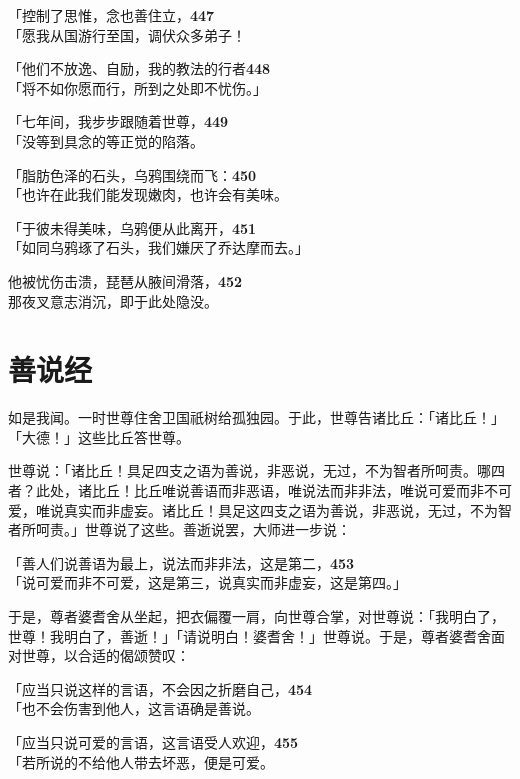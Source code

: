 「控制了思惟，念也善住立，\hfill{\grayfootnotesize \textbf{447}} \\
「愿我从国游行至国，调伏众多弟子！


「他们不放逸、自励，我的教法的行者\hfill{\grayfootnotesize \textbf{448}} \\
「将不如你愿而行，所到之处即不忧伤。」


「七年间，我步步跟随着世尊，\hfill{\grayfootnotesize \textbf{449}} \\
「没等到具念的等正觉的陷落。


「脂肪色泽的石头，乌鸦围绕而飞：\hfill{\grayfootnotesize \textbf{450}} \\
「也许在此我们能发现嫩肉，也许会有美味。


「于彼未得美味，乌鸦便从此离开，\hfill{\grayfootnotesize \textbf{451}} \\
「如同乌鸦琢了石头，我们嫌厌了乔达摩而去。」


他被忧伤击溃，琵琶从腋间滑落，\hfill{\grayfootnotesize \textbf{452}} \\
那夜叉意志消沉，即于此处隐没。


\section{善说经}

如是我闻。一时世尊住舍卫国祇树给孤独园。于此，世尊告诸比丘：「诸比丘！」「大德！」这些比丘答世尊。


世尊说：「诸比丘！具足四支之语为善说，非恶说，无过，不为智者所呵责。哪四者？此处，诸比丘！比丘唯说善语而非恶语，唯说法而非非法，唯说可爱而非不可爱，唯说真实而非虚妄。诸比丘！具足这四支之语为善说，非恶说，无过，不为智者所呵责。」世尊说了这些。善逝说罢，大师进一步说：


「善人们说善语为最上，说法而非非法，这是第二，\hfill{\grayfootnotesize \textbf{453}} \\
「说可爱而非不可爱，这是第三，说真实而非虚妄，这是第四。」


于是，尊者婆耆舍从坐起，把衣偏覆一肩，向世尊合掌，对世尊说：「我明白了，世尊！我明白了，善逝！」「请说明白！婆耆舍！」世尊说。于是，尊者婆耆舍面对世尊，以合适的偈颂赞叹：


「应当只说这样的言语，不会因之折磨自己，\hfill{\grayfootnotesize \textbf{454}} \\
「也不会伤害到他人，这言语确是善说。


「应当只说可爱的言语，这言语受人欢迎，\hfill{\grayfootnotesize \textbf{455}} \\
「若所说的不给他人带去坏恶，便是可爱。


